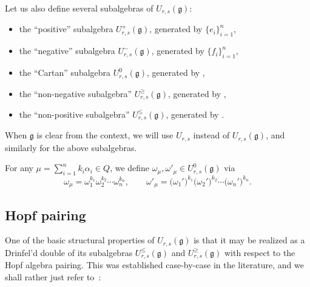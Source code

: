 \documentclass[10pt,a4paper]{amsart}
\numberwithin{equation}{section}
\newcommand{\fg}{\mathfrak{g}}
\begin{document}
Let us also define several subalgebras of $U_{r,s}(\fg)$:
\begin{itemize}\itemsep=0pt
\item the ``positive'' subalgebra $U_{r,s}^{+}(\fg)$, generated by $\{e_{i}\}_{i=1}^{n}$,

\item the ``negative'' subalgebra $U_{r,s}^{-}(\fg)$, generated by $\{f_{i}\}_{i=1}^{n}$,

\item the ``Cartan'' subalgebra $U_{r,s}^{0}(\fg)$, generated by
,

\item the ``non-negative subalgebra'' $U_{r,s}^{\ge}(\fg)$, generated by
,

\item the ``non-positive subalgebra'' $U_{r,s}^{\le}(\fg)$, generated by
.

\end{itemize}
When $\fg$ is clear from the context, we will use $U_{r,s}$ instead of $U_{r,s}(\fg)$, and similarly for the above subalgebras.


For any $\mu=\sum_{i=1}^{n} k_{i}\alpha_{i}\in Q$, we define $\omega_\mu,\omega'_\mu\in U_{r,s}^{0}(\fg)$ via
\[
 \omega_{\mu} = \omega_{1}^{k_{1}}\omega_{2}^{k_{2}} \cdots \omega_{n}^{k_{n}}, \qquad
 \omega'_\mu = \bigl(\omega_{1}'\bigr)^{k_{1}}\bigl(\omega_{2}'\bigr)^{k_{2}} \cdots \bigl(\omega_{n}'\bigr)^{k_{n}}.
\]

\subsection{Hopf pairing}%

One of the basic structural properties of $U_{r,s}(\fg)$ is that it may be realized as a Drinfel'd double of its subalgebras $U^{\le}_{r,s}(\fg)$ and $U^{\ge}_{r,s}(\fg)$ with respect to the Hopf algebra pairing. This was established case-by-case in the literature, and we shall rather just refer to~\cite{HP}:
\end{document}
